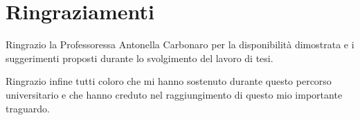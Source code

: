 \rhead[\fancyplain{}{\bfseries \leftmark}]{\fancyplain{}{\bfseries
\thepage}}

\clearpage{\pagestyle{empty}\cleardoublepage}
\chapter*{Ringraziamenti}
\thispagestyle{empty}
Ringrazio la Professoressa Antonella Carbonaro per la disponibilità dimostrata e i suggerimenti proposti durante lo svolgimento del lavoro di tesi.

Ringrazio infine tutti coloro che mi hanno sostenuto durante questo percorso universitario e che hanno creduto nel raggiungimento di questo mio importante traguardo.